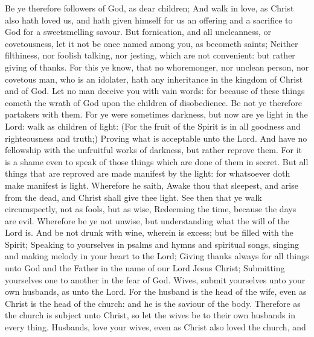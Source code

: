  Be ye therefore followers of God, as dear children;
 And walk in love, as Christ also hath loved us, and hath
given himself for us an offering and a sacrifice to God for a
sweetsmelling savour.  But fornication, and all
uncleanness, or covetousness, let it not be once named among you, as
becometh saints;  Neither filthiness, nor foolish talking,
nor jesting, which are not convenient: but rather giving of thanks.
 For this ye know, that no whoremonger, nor unclean
person, nor covetous man, who is an idolater, hath any inheritance in
the kingdom of Christ and of God.  Let no man deceive you
with vain words: for because of these things cometh the wrath of God
upon the children of disobedience.  Be not ye therefore
partakers with them.  For ye were sometimes darkness, but
now are ye light in the Lord: walk as children of light: 
(For the fruit of the Spirit is in all goodness and righteousness and
truth;)  Proving what is acceptable unto the Lord.
 And have no fellowship with the unfruitful works of
darkness, but rather reprove them.  For it is a shame
even to speak of those things which are done of them in secret.
 But all things that are reproved are made manifest by
the light: for whatsoever doth make manifest is light. 
Wherefore he saith, Awake thou that sleepest, and arise from the dead,
and Christ shall give thee light.  See then that ye walk
circumspectly, not as fools, but as wise,  Redeeming the
time, because the days are evil.  Wherefore be ye not
unwise, but understanding what the will of the Lord is. 
And be not drunk with wine, wherein is excess; but be filled with the
Spirit;  Speaking to yourselves in psalms and hymns and
spiritual songs, singing and making melody in your heart to the Lord;
 Giving thanks always for all things unto God and the
Father in the name of our Lord Jesus Christ;  Submitting
yourselves one to another in the fear of God.  Wives,
submit yourselves unto your own husbands, as unto the Lord.
 For the husband is the head of the wife, even as Christ
is the head of the church: and he is the saviour of the body.
 Therefore as the church is subject unto Christ, so let
the wives be to their own husbands in every thing. 
Husbands, love your wives, even as Christ also loved the church, and
